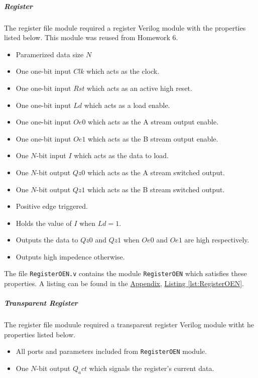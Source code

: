 \subparagraph{Register}

The register file module required a register Verilog module with the properties listed below.
This module was reused from Homework 6.

\begin{itemize}
    \item Paramerized data size $N$
    \item One one-bit input $Clk$ which acts as the clock.
    \item One one-bit input $Rst$ which acts as an active high reset.
    \item One one-bit input $Ld$ which acts as a load enable.
    \item One one-bit input $Oe0$ which acts as the A stream output enable.
    \item One one-bit input $Oe1$ which acts as the B stream output enable.
    \item One $N$-bit input $I$ which acts as the data to load.
    \item One $N$-bit output $Qz0$ which acts as the A stream switched output.
    \item One $N$-bit output $Qz1$ which acts as the B stream switched output.
    \item Positive edge triggered.
    \item Holds the value of $I$ when $Ld = 1$.
    \item Outputs the data to $Qz0$ and $Qz1$ when $Oe0$ and $Oe1$ are high respectively.
    \item Outputs high impedence otherwise.
\end{itemize}

The file \verb|RegisterOEN.v| contains the module \verb|RegisterOEN| which satisfies these properties.
A listing can be found in the \hyperref[sec:appendix]{Appendix}, \hyperref[lst:RegisterOEN]{Listing \ref*{lst:RegisterOEN}}.

\subparagraph{Transparent Register}

The register file moduule required a transparent register Verilog module witht he properties listed below.

\begin{itemize}
    \item All ports and parameters included from \verb|RegisterOEN| module.
    \item One $N$-bit output $Q_act$ which signals the register's current data.
\end{itemize}

